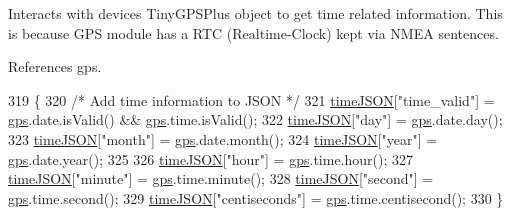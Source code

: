 Interacts with devices Tiny\+G\+P\+S\+Plus object to get time related information. This is because G\+PS module has a R\+TC (Realtime-\/\+Clock) kept via N\+M\+EA sentences. 

References gps.


\begin{DoxyCode}
319 \{
320   \textcolor{comment}{/* Add time information to JSON */}
321   \hyperlink{logging-device_8ino_acc172a29cb5ff709b48b650d9fb6503c}{timeJSON}[\textcolor{stringliteral}{"time\_valid"}] = \hyperlink{logging-device_8ino_a169c53997a7da1d0fb99aec1b4675ce8}{gps}.date.isValid() && \hyperlink{logging-device_8ino_a169c53997a7da1d0fb99aec1b4675ce8}{gps}.time.isValid();
322   \hyperlink{logging-device_8ino_acc172a29cb5ff709b48b650d9fb6503c}{timeJSON}[\textcolor{stringliteral}{"day"}] = \hyperlink{logging-device_8ino_a169c53997a7da1d0fb99aec1b4675ce8}{gps}.date.day();
323   \hyperlink{logging-device_8ino_acc172a29cb5ff709b48b650d9fb6503c}{timeJSON}[\textcolor{stringliteral}{"month"}] = \hyperlink{logging-device_8ino_a169c53997a7da1d0fb99aec1b4675ce8}{gps}.date.month();
324   \hyperlink{logging-device_8ino_acc172a29cb5ff709b48b650d9fb6503c}{timeJSON}[\textcolor{stringliteral}{"year"}] = \hyperlink{logging-device_8ino_a169c53997a7da1d0fb99aec1b4675ce8}{gps}.date.year();
325 
326   \hyperlink{logging-device_8ino_acc172a29cb5ff709b48b650d9fb6503c}{timeJSON}[\textcolor{stringliteral}{"hour"}] = \hyperlink{logging-device_8ino_a169c53997a7da1d0fb99aec1b4675ce8}{gps}.time.hour();
327   \hyperlink{logging-device_8ino_acc172a29cb5ff709b48b650d9fb6503c}{timeJSON}[\textcolor{stringliteral}{"minute"}] = \hyperlink{logging-device_8ino_a169c53997a7da1d0fb99aec1b4675ce8}{gps}.time.minute();
328   \hyperlink{logging-device_8ino_acc172a29cb5ff709b48b650d9fb6503c}{timeJSON}[\textcolor{stringliteral}{"second"}] = \hyperlink{logging-device_8ino_a169c53997a7da1d0fb99aec1b4675ce8}{gps}.time.second();
329   \hyperlink{logging-device_8ino_acc172a29cb5ff709b48b650d9fb6503c}{timeJSON}[\textcolor{stringliteral}{"centiseconds"}] = \hyperlink{logging-device_8ino_a169c53997a7da1d0fb99aec1b4675ce8}{gps}.time.centisecond();
330 \}
\end{DoxyCode}
